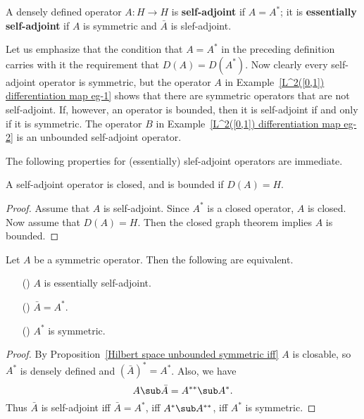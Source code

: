 \begin{definition}
A densely defined operator $A:H\to H$ is \textbf{self-adjoint} if $A=A^*$; it is \textbf{essentially self-adjoint} if $A$ is symmetric and $\bar{A}$ is slef-adjoint.
\end{definition}
Let us emphasize that the condition that $A=A^*$ in the preceding definition carries with it the requirement that $D(A)=D(A^*)$. Now clearly every self-adjoint operator is symmetric, but the operator $A$ in Example~\ref{L^2([0,1]) differentiation map eg-1} shows that there are symmetric operators that are not self-adjoint. If, however, an operator is bounded, then it is self-adjoint if and only if it is symmetric. The operator $B$ in Example~\ref{L^2([0,1]) differentiation map eg-2} is an unbounded self-adjoint operator.\par
The following properties for (essentially) slef-adjoint operators are immediate.
\begin{proposition}
A self-adjoint operator is closed, and is bounded if $D(A)=H$.
\end{proposition}
\begin{proof}
Assume that $A$ is self-adjoint. Since $A^*$ is a closed operator, $A$ is closed. Now assume that $D(A)=H$. Then the closed graph theorem implies $A$ is bounded.
\end{proof}
\begin{proposition}\label{Hilbert space symmetric essentially self-adjoint iff}
Let $A$ be a symmetric operator. Then the following are equivalent.
\begin{itemize}
\item[(\rmnum{1})] $A$ is essentially self-adjoint.
\item[(\rmnum{2})] $\bar{A}=A^*$.
\item[(\rmnum{3})] $A^*$ is symmetric.
\end{itemize}
\end{proposition}
\begin{proof}
By Proposition~\ref{Hilbert space unbounded symmetric iff} $A$ is closable, so $A^*$ is densely defined and $(\bar{A})^*=A^*$. Also, we have
\[A\sub\bar{A}=A^{**}\sub A^*.\]
Thus $\bar{A}$ is self-adjoint iff $\bar{A}=A^*$, iff $A^*\sub A^{**}$, iff $A^*$ is symmetric. 
\end{proof}
